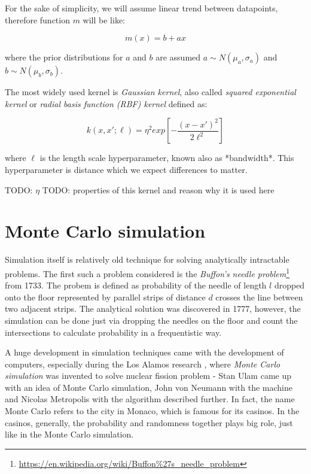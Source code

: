 \documentclass[
  digital, %
  oneside, %
  lof,     %
  lot,     %
]{fithesis4}
\begin{document}
For the sake of simplicity, we will assume linear 
trend between datapoints, therefore function 
$m$ will be like:

\begin{equation}
m(x) = b + a x
\end{equation}

where the prior distributions for $a$ and $b$ 
are assumed 
$a \sim N \left( \mu_a, \sigma_a \right)$ and 
$b \sim N \left( \mu_b, \sigma_b \right)$.

The most widely used kernel is \textit{Gaussian kernel}, 
also called \textit{squared exponential kernel} or 
\textit{radial basis function (RBF) kernel} defined as:

\begin{equation}
k \left( x, x'; \ell \right) = \eta^2 exp \left[ -\frac{(x - x')^2}{2\ell^2} \right]
\end{equation}

where $\ell$ is the length scale hyperparameter, 
known also as *bandwidth*. 
This hyperparameter is distance which we expect 
differences to matter.

TODO: $\eta$
TODO: properties of this kernel and reason why it is used here


\section{Monte Carlo simulation}

Simulation itself is relatively old technique for 
solving analytically intractable problems. 
The first such a problem considered is the 
\textit{Buffon's needle problem}\footnote{\url{https://en.wikipedia.org/wiki/Buffon\%27s_needle_problem}} from 1733. 
The probem is defined as probability of the 
needle of length $l$ dropped onto the floor 
represented by parallel strips of distance 
$d$ crosses the line between two adjacent 
strips. 
The analytical solution was discovered in 1777, 
however, the simulation can be done just via 
dropping the needles on the floor and count 
the intersections to calculate probability 
in a frequentistic way.

A huge development in simulation techniques 
came with the development of computers, 
especially during the Los Alamos research 
\cite{metropolis1987}, where 
\textit{Monte Carlo simulation} was invented to 
solve nuclear fission problem - Stan Ulam 
came up with an idea of Monte Carlo simulation, 
John von Neumann with the machine and 
Nicolas Metropolis with the algorithm described 
further.
In fact, the name Monte Carlo refers to the city 
in Monaco, which is famous for its casinos. 
In the casinos, generally, the probability and 
randomness together plays big role, just like in the 
Monte Carlo simulation.
\end{document}
